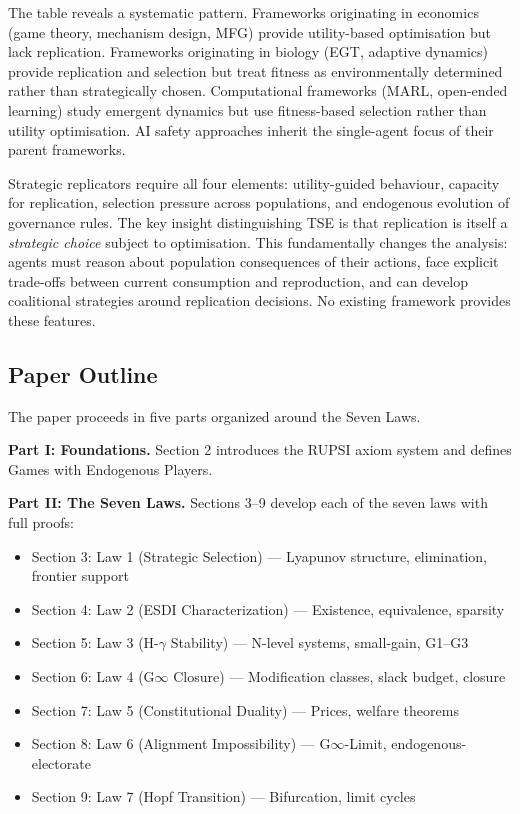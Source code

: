 \documentclass[12pt]{article}
\begin{document}
\vspace{1em}
The table reveals a systematic pattern. Frameworks originating in economics (game theory, mechanism design, MFG) provide utility-based optimisation but lack replication. Frameworks originating in biology (EGT, adaptive dynamics) provide replication and selection but treat fitness as environmentally determined rather than strategically chosen. Computational frameworks (MARL, open-ended learning) study emergent dynamics but use fitness-based selection rather than utility optimisation. AI safety approaches inherit the single-agent focus of their parent frameworks.

Strategic replicators require all four elements: utility-guided behaviour, capacity for replication, selection pressure across populations, and endogenous evolution of governance rules. The key insight distinguishing TSE is that replication is itself a \emph{strategic choice} subject to optimisation. This fundamentally changes the analysis: agents must reason about population consequences of their actions, face explicit trade-offs between current consumption and reproduction, and can develop coalitional strategies around replication decisions. No existing framework provides these features.

\subsection{Paper Outline}

The paper proceeds in five parts organized around the Seven Laws.

\textbf{Part I: Foundations.} Section 2 introduces the RUPSI axiom system and defines Games with Endogenous Players.

\textbf{Part II: The Seven Laws.} Sections 3--9 develop each of the seven laws with full proofs:
\begin{itemize}
    \item Section 3: Law 1 (Strategic Selection) --- Lyapunov structure, elimination, frontier support
    \item Section 4: Law 2 (ESDI Characterization) --- Existence, equivalence, sparsity
    \item Section 5: Law 3 (H-$\gamma$ Stability) --- N-level systems, small-gain, G1--G3
    \item Section 6: Law 4 (G$\infty$ Closure) --- Modification classes, slack budget, closure
    \item Section 7: Law 5 (Constitutional Duality) --- Prices, welfare theorems
    \item Section 8: Law 6 (Alignment Impossibility) --- G$\infty$-Limit, endogenous-electorate
    \item Section 9: Law 7 (Hopf Transition) --- Bifurcation, limit cycles
\end{itemize}
\end{document}
